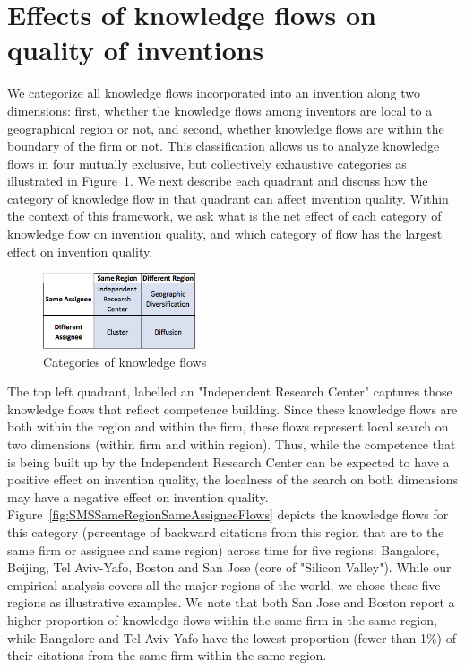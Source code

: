 \documentclass[parskip=full,11pt,letterpaper]{article}
\begin{document}
\section*{Effects of knowledge flows on quality of inventions}
We categorize all knowledge flows incorporated into an invention along two dimensions:  first, whether the knowledge flows among inventors are local to a geographical region or not, and second, whether knowledge flows are within the boundary of the firm or not. This classification allows us to analyze knowledge flows in four mutually exclusive, but collectively exhaustive categories as illustrated in Figure~\ref{fig:2x2}. We next describe each quadrant and discuss how the category of knowledge flow in that quadrant can affect invention quality. Within the context of this framework, we ask what is the net effect of each category of knowledge flow on invention quality, and which category of flow has the largest effect on invention quality. \par
\begin{figure}[h!]
\begin{centering}
  \includegraphics[width=0.4\textwidth]{2x2}
  \caption{Categories of knowledge flows}
  \label{fig:2x2}
\end{centering}
\end{figure}



The top left quadrant, labelled an "Independent Research Center" captures those knowledge flows that reflect competence building. Since these knowledge flows  are both within the region and within the firm, these flows represent local search on two dimensions (within firm and within region).  Thus, while the competence that is being built up by the Independent Research Center can be expected to have a positive effect on invention quality, the localness of the search on both dimensions may have a negative effect on invention quality. Figure~\ref{fig:SMSSameRegionSameAssigneeFlows} depicts the knowledge flows for this category (percentage of backward citations from this region that are to the same firm or assignee and same region) across time for five regions: Bangalore, Beijing, Tel Aviv-Yafo, Boston and San Jose (core of "Silicon Valley"). While our empirical analysis covers all the major regions of the world, we chose these five regions as illustrative examples. We note that both San Jose and Boston report a higher proportion of knowledge flows within the same firm in the same region, while Bangalore and Tel Aviv-Yafo have the lowest proportion (fewer than 1\%) of their citations from the same firm within the same region. \par
\end{document}
